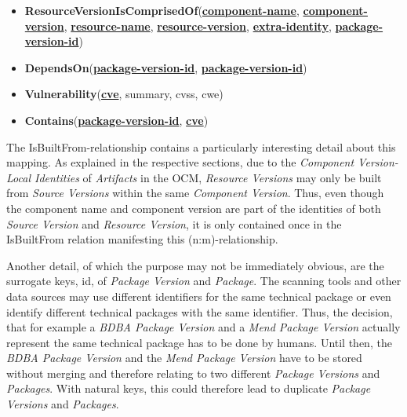 \begin{itemize}
	\item \textbf{ResourceVersionIsComprisedOf}(\textbf{\underline{component-name}}, \textbf{\underline{component-version}}, \textbf{\underline{resource-name}}, \textbf{\underline{resource-version}}, \textbf{\underline{extra-identity}}, \textbf{\underline{package-version-id}})
	\item \textbf{DependsOn}(\textbf{\underline{package-version-id}}, \textbf{\underline{package-version-id}})
	\item \textbf{Vulnerability}(\textbf{\underline{cve}}, summary, cvss, cwe)
	\item \textbf{Contains}(\textbf{\underline{package-version-id}}, \textbf{\underline{cve}})
\end{itemize}

The IsBuiltFrom-relationship contains a particularly interesting detail about this mapping. As explained in the respective sections, due to the \emph{Component Version-Local Identities} of \emph{Artifacts} in the OCM, \emph{Resource Versions} may only be built from \emph{Source Versions} within the same \emph{Component Version}. Thus, even though the component name and component version are part of the identities of both \emph{Source Version} and \emph{Resource Version}, it is only contained once in the IsBuiltFrom relation manifesting this (n:m)-relationship.\par
Another detail, of which the purpose may not be immediately obvious, are the surrogate keys, id, of \emph{Package Version} and \emph{Package}. The scanning tools and other data sources may use different identifiers for the same technical package or even identify different technical packages with the same identifier. Thus, the decision, that for example a \emph{BDBA Package Version} and a \emph{Mend Package Version} actually represent the same technical package has to be done by humans. Until then, the \emph{BDBA Package Version} and the \emph{Mend Package Version} have to be stored without merging and therefore relating to two different \emph{Package Versions} and \emph{Packages}. With natural keys, this could therefore lead to duplicate \emph{Package Versions} and \emph{Packages}.

